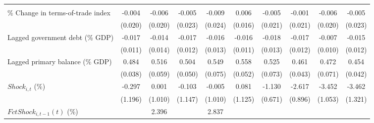 {\begin{tabular}{l*{9}{c}}
                    &                     &                     &                     &                     &                     &                     &                     &                     &                     \\
\addlinespace
\% Change in terms-of-trade index&      -0.004         &      -0.006         &      -0.005         &      -0.009         &       0.006         &      -0.005         &      -0.001         &      -0.006         &      -0.005         \\
                    &     (0.020)         &     (0.020)         &     (0.023)         &     (0.024)         &     (0.016)         &     (0.021)         &     (0.021)         &     (0.020)         &     (0.023)         \\
\addlinespace
Lagged government debt (\% GDP)&      -0.017         &      -0.014         &      -0.017         &      -0.016         &      -0.016         &      -0.018         &      -0.017         &      -0.007         &      -0.015         \\
                    &     (0.011)         &     (0.014)         &     (0.012)         &     (0.013)         &     (0.011)         &     (0.013)         &     (0.012)         &     (0.010)         &     (0.012)         \\
\addlinespace
Lagged primary balance (\% GDP)&       0.484\sym{***}&       0.516\sym{***}&       0.504\sym{***}&       0.549\sym{***}&       0.558\sym{***}&       0.525\sym{***}&       0.461\sym{***}&       0.472\sym{***}&       0.454\sym{***}\\
                    &     (0.038)         &     (0.059)         &     (0.050)         &     (0.075)         &     (0.052)         &     (0.073)         &     (0.043)         &     (0.071)         &     (0.042)         \\
\addlinespace
$ Shock_{i,t}$ (\%) &      -0.297         &       0.001         &      -0.103         &      -0.005         &       0.081         &      -1.130         &      -2.617\sym{**} &      -3.452\sym{***}&      -3.462\sym{**} \\
                    &     (1.196)         &     (1.010)         &     (1.147)         &     (1.010)         &     (1.125)         &     (0.671)         &     (0.896)         &     (1.053)         &     (1.321)         \\
\addlinespace
$ FctShock_{i,t-1}(t)$ (\%)&                     &       2.396         &                     &       2.837         &                     &                     &                     &                     &                     \\

\end{tabular}}
